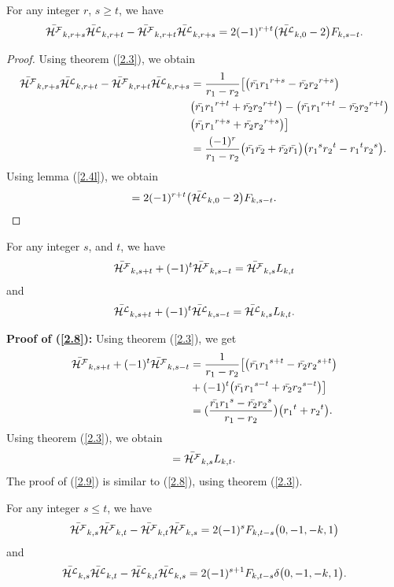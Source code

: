 \begin{theorem} For any integer $r$, $s\geq t$,  we have\label{2.13t}
\begin{align*}
\bar{{\mathcal{H^F}}}_{k, r+s}\bar{{\mathcal{H^L}}}_{k,r+t}-\bar{{\mathcal{H^F}}}_{k,r+t}\bar{{\mathcal{H^L}}}_{k,r+s}=2(-1)^{r+t}\big(\bar{{\mathcal{H^L}}}_{k,0}-2\big)F_{k,s-t}.
\end{align*}
\end{theorem}
\begin{proof}
Using theorem (\ref{2.3}), we obtain
\begin{align*}
\bar{{\mathcal{H^F}}}_{k, r+s}\bar{{\mathcal{H^L}}}_{k,r+t}-\bar{{\mathcal{H^F}}}_{k,r+t}\bar{{\mathcal{H^L}}}_{k,r+s}&=\dfrac{1}{r_1-r_2}\big[\big(\bar{r_1}{r_1}^{r+s}-\bar{r_2}{r_2}^{r+s}\big)\\&\big(\bar{r_1}{r_1}^{r+t}+\bar{r_2}{r_2}^{r+t}\big)-\big(\bar{r_1}{r_1}^{r+t}-\bar{r_2}{r_2}^{r+t}\big)\\&\big(\bar{r_1}{r_1}^{r+s}+\bar{r_2}{r_2}^{r+s}\big)\big]\\
&=\dfrac{(-1)^r}{r_1-r_2}\big(\bar{r_1}\bar{r_2}+\bar{r_2}\bar{r_1}\big)\big({r_1}^s{r_2}^t-{r_1}^t{r_2}^s\big).
\end{align*}
Using lemma (\ref{2.4l}), we obtain
\begin{align*}
=2(-1)^{r+t}\big(\bar{{\mathcal{H^L}}}_{k,0}-2\big)F_{k,s-t}.
\end{align*}
\end{proof}
\begin{theorem} For any integer $s$, and $ t$,  we have\label{2.14t}
\begin{align}
\hf_{k, s+t}+(-1)^{t}\hf_{k,s-t}=\hf_{k,s}L_{k,t}\label{2.8}
\end{align}
and 
\begin{align}
\hl_{k, s+t}+(-1)^{t}\hl_{k,s-t}=\hl_{k,s}L_{k,t}.\label{2.9}
\end{align}
\end{theorem}
\noindent\textbf{Proof of (\ref{2.8}):}
Using theorem (\ref{2.3}), we get
\begin{align*}
\bar{{\mathcal{H^F}}}_{k, s+t}+(-1)^{t}\bar{{\mathcal{H^F}}}_{k,s-t}&=\dfrac{1}{r_1-r_2}\big[\big(\bar{r_1}{r_1}^{s+t}-\bar{r_2}{r_2}^{s+t}\big)\\&+(-1)^t\big(\bar{r_1}{r_1}^{s-t}+\bar{r_2}{r_2}^{s-t}\big)\big]\\
&=(\dfrac{\bar{r_1}{r_1}^{s}-\bar{r_2}{r_2}^{s}}{r_1-r_2}\big)\big({r_1}^t+{r_2}^t\big).
\end{align*}
Using theorem (\ref{2.3}), we obtain
\begin{align*}
=\bar{{\mathcal{H^F}}}_{k,s}L_{k,t}.
\end{align*}
The proof of (\ref{2.9}) is similar to (\ref{2.8}), using theorem (\ref{2.3}).
\begin{theorem} For any integer $s\leq t$,  we have\label{2.15t}
\begin{align}
\hf_{k, s}\hf_{k,t}-\hf_{k,t}\hf_{k,s}=2(-1)^sF_{k, t-s}\big(0, -1, -k, 1\big)\label{2.10}
\end{align}
and 
\begin{align}
\hl_{k, s}\hl_{k,t}-\hl_{k,t}\hl_{k,s}=2(-1)^{s+1}F_{k, t-s}\delta\big(0, -1, -k, 1\big).\label{2.11}
\end{align}
\end{theorem}
